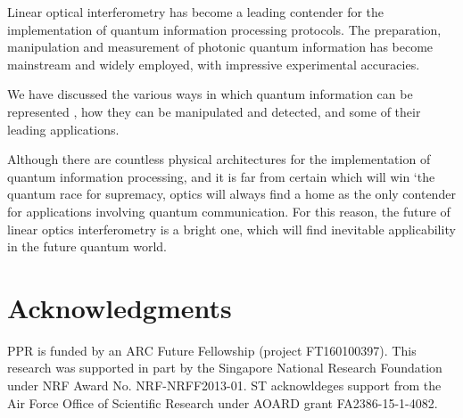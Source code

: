 \documentclass[times,final]{elsarticle}
\newcommand{\sihui}[1]{{\color{Orchid}{#1}}}
\begin{document}
Linear optical interferometry has become a leading contender for the implementation of quantum information processing protocols. The preparation, manipulation and measurement of photonic quantum information has become mainstream and widely employed, with impressive experimental accuracies.

We have discussed the various ways in which quantum information can be represented \sihui{in photonics}, how they can be manipulated and detected, and some of their leading applications.

Although there are countless physical architectures for the implementation of quantum information processing, and it is far from certain which will win `the quantum race for supremacy, optics will always find a home as the only contender for applications involving quantum communication. For this reason, the future of linear optics interferometry is a bright one, which will find inevitable applicability in the future quantum world.

%
%

\section*{Acknowledgments}
PPR is funded by an ARC Future Fellowship (project FT160100397). This research was supported in part by the Singapore National Research Foundation under NRF Award No. NRF-NRFF2013-01. ST acknowldeges support from the Air Force Office of Scientific Research under AOARD grant FA2386-15-1-4082.

%
%



\end{document}
